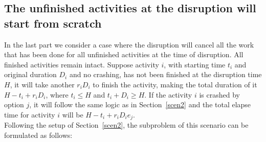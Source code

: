 \documentclass[11pt]{article}
\begin{document}
	\subsection{The unfinished activities at the disruption will start from scratch} \label{scen3}
		In the last part we consider a case where the disruption will cancel all the work that has been done for all unfinished activities at the time of disruption. All finished activities remain intact. Suppose activity \(i\), with starting time \(t_i\) and original duration \(D_i\) and no crashing, has not been finished at the disruption time \(H\), it will take another \(r_iD_i\) to finish the activity, making the total duration of it \(H - t_i + r_iD_i\), where \(t_i \leq H\) and \(t_i + D_i \geq H\). If the activity \(i\) is crashed by option \(j\), it will follow the same logic as in Section~\ref{scen2} and the total elapse time for activity \(i\) will be \(H - t_i + r_iD_ie_j\).\\
		\newline Following the setup of Section~\ref{scen2}, the subproblem of this scenario can be formulated as follows:
\end{document}
